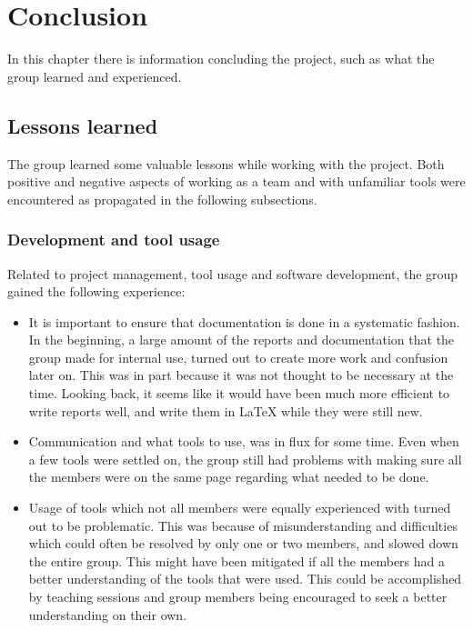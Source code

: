 \chapter{Conclusion}
In this chapter there is information concluding the project, such as what the group learned and experienced.
\section{Lessons learned}
The group learned some valuable lessons while working with the project. Both positive and negative aspects of working as a team and with unfamiliar tools were encountered as propagated in the following subsections.
\subsection{Development and tool usage}
Related to project management, tool usage and software development, the group gained the following experience:
\begin{itemize}
 \item  It is important to ensure that documentation is done in a systematic fashion. In the beginning, a large amount of the reports and documentation that the group made for internal use, turned out to create more work and confusion later on. This was in part because it was not thought to be necessary at the time. Looking back, it seems like it would have been much more efficient to write reports well, and write them in LaTeX  while they were still new.
 \item Communication and what tools to use, was in flux for some time. Even when a few tools were settled on, the group still had problems with making sure all the members were on the same page regarding what needed to be done. 
 \item  Usage of tools which not all members were equally experienced with turned out to be problematic. This was because of misunderstanding and difficulties which could often be resolved by only one or two members, and slowed down the entire group. This might have been mitigated if all the members had a better understanding of the tools that were used. This could be accomplished by teaching sessions and group members being encouraged to seek a better understanding on their own.
\end{itemize} 

